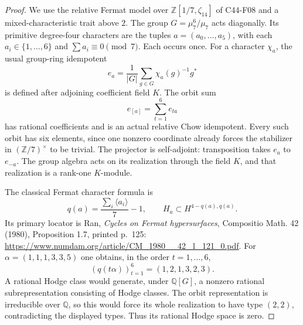 \documentclass[11pt]{article}
\theoremstyle{remark}\newtheorem{remark}[theorem]{Remark}
\begin{document}
\begin{proof}
We use the relative Fermat model over
\(\mathbb Z[1/7,\zeta _{14}]\) of C44-F08 and a mixed-characteristic trait
above \(2\). The group \(G=\mu _7^6/\mu _7\) acts diagonally.
Its primitive degree-four characters are the tuples
\(a=(a_0,\ldots,a_5)\), with each \(a_i\in\{1,\ldots,6\}\) and
\(\sum a_i\equiv0\pmod7\). Each occurs once. For a character \(\chi_a\),
the usual group-ring idempotent
\[
 e_a=\frac1{|G|}\sum_{g\in G}\chi_a(g)^{-1}g^*
\]
is defined after adjoining coefficient field \(K\). The orbit sum
\[
 e_{[a]}=\sum_{t=1}^{6}e_{ta}
\]
has rational coefficients and is an actual relative Chow idempotent.
Every such orbit has six elements, since one nonzero coordinate already
forces the stabilizer in \((\mathbb Z/7)^\times\) to be trivial.
The projector is self-adjoint: transposition takes \(e_a\) to \(e_{-a}\).
The group algebra acts on its realization through the field \(K\), and
that realization is a rank-one \(K\)-module.

The classical Fermat character formula is
\[
 q(a)=\frac{\sum_i\langle a_i\rangle}{7}-1,\qquad
 H_a\subset H^{4-q(a),q(a)}.
\]
Its primary locator is Ran, \emph{Cycles on Fermat hypersurfaces},
Compositio Math. 42 (1980), Proposition 1.7, printed p.~125:
\url{https://www.numdam.org/article/CM_1980__42_1_121_0.pdf}.
For \(\alpha=(1,1,1,3,3,5)\) one obtains, in the order \(t=1,\ldots,6\),
\[
 (q(t\alpha))_{t=1}^6=(1,2,1,3,2,3).
\]
A rational Hodge class would generate, under \(\mathbb Q[G]\), a
nonzero rational subrepresentation consisting of Hodge classes.
The orbit representation is irreducible over \(\mathbb Q\), so this
would force its whole realization to have type \((2,2)\), contradicting
the displayed types. Thus its rational Hodge space is zero.


\end{proof}
\end{document}
